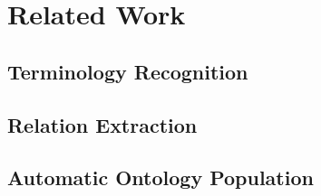 \section{Related Work}
\subsection{Terminology Recognition}
\subsection{Relation Extraction}
\cite{hearst98}
\cite{Brin:1998:EPR:646543.696220}
\subsection{Automatic Ontology Population}

